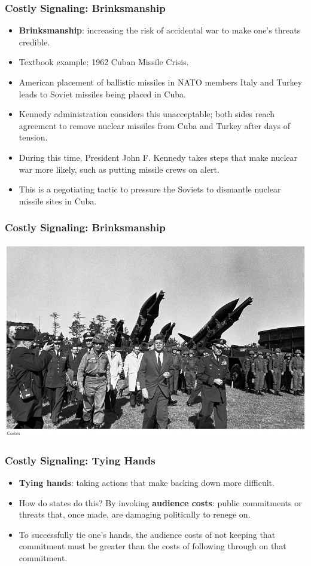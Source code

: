 \documentclass{beamer}
\begin{document}
\begin{frame} 
\frametitle{\LARGE{Costly Signaling: Brinksmanship}}
\begin{itemize}
	\item \textbf{Brinksmanship}: increasing the risk of accidental war to make one's threats credible. \pause 
	\item Textbook example: 1962 Cuban Missile Crisis. \pause
	\item American placement of ballistic missiles in NATO members Italy and Turkey leads to Soviet missiles being placed in Cuba. \pause
	\item Kennedy administration considers this unacceptable; both sides reach agreement to remove nuclear missiles from Cuba and Turkey after days of tension. \pause
	\item During this time, President John F. Kennedy takes steps that make nuclear war more likely, such as putting missile crews on alert. \pause
	\item This is a negotiating tactic to pressure the Soviets to dismantle nuclear missile sites in Cuba. 
\end{itemize}
\end{frame}

\begin{frame}
	\frametitle{\LARGE{Costly Signaling: Brinksmanship}}
	\centering
	\includegraphics[width=\textwidth,height=0.8\textheight,keepaspectratio]{Cubanmissilecrisis.jpg}
\end{frame}


\begin{frame} 
\frametitle{\LARGE{Costly Signaling: Tying Hands}}
\begin{itemize}
		\item \textbf{Tying hands}: taking actions that make backing down more difficult. \pause
		\item How do states do this? By invoking \textbf{audience costs}: public commitments or threats that, once made, are damaging politically to renege on. \pause
		\item To successfully tie one's hands, the audience costs of not keeping that commitment must be greater than the costs of following through on that commitment. 
\end{itemize}
\end{frame}
\end{document}
